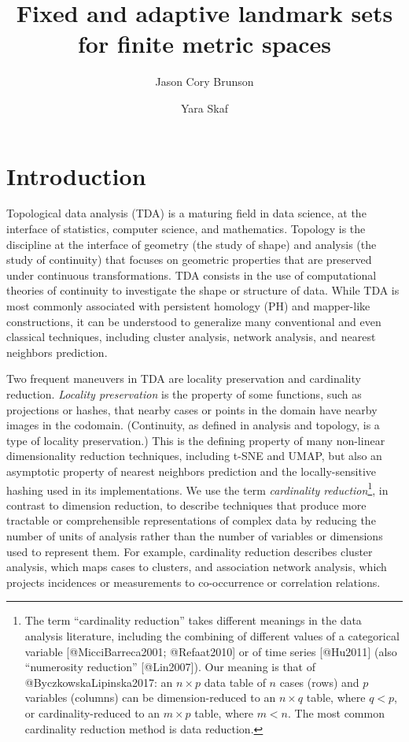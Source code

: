 \documentclass[
]{article}
\title{Fixed and adaptive landmark sets for finite metric spaces}
\author{Jason Cory Brunson \and Yara Skaf}
\date{}
\begin{document}
\maketitle

\pagebreak

\hypertarget{introduction}{%
\section{Introduction}\label{introduction}}

Topological data analysis (TDA) is a maturing field in data science, at
the interface of statistics, computer science, and mathematics. Topology
is the discipline at the interface of geometry (the study of shape) and
analysis (the study of continuity) that focuses on geometric properties
that are preserved under continuous transformations. TDA consists in the
use of computational theories of continuity to investigate the shape or
structure of data. While TDA is most commonly associated with persistent
homology (PH) and mapper-like constructions, it can be understood to
generalize many conventional and even classical techniques, including
cluster analysis, network analysis, and nearest neighbors prediction.

Two frequent maneuvers in TDA are locality preservation and cardinality
reduction. \emph{Locality preservation} is the property of some
functions, such as projections or hashes, that nearby cases or points in
the domain have nearby images in the codomain. (Continuity, as defined
in analysis and topology, is a type of locality preservation.) This is
the defining property of many non-linear dimensionality reduction
techniques, including t-SNE and UMAP, but also an asymptotic property of
nearest neighbors prediction and the locally-sensitive hashing used in
its implementations. We use the term \emph{cardinality
reduction}\footnote{The term ``cardinality reduction'' takes different
  meanings in the data analysis literature, including the combining of
  different values of a categorical variable {[}@MicciBarreca2001;
  @Refaat2010{]} or of time series {[}@Hu2011{]} (also ``numerosity
  reduction'' {[}@Lin2007{]}). Our meaning is that of
  @ByczkowskaLipinska2017: an \(n\times p\) data table of \(n\) cases
  (rows) and \(p\) variables (columns) can be dimension-reduced to an
  \(n\times q\) table, where \(q<p\), or cardinality-reduced to an
  \(m\times p\) table, where \(m<n\). The most common cardinality
  reduction method is data reduction.}, in contrast to dimension
reduction, to describe techniques that produce more tractable or
comprehensible representations of complex data by reducing the number of
units of analysis rather than the number of variables or dimensions used
to represent them. For example, cardinality reduction describes cluster
analysis, which maps cases to clusters, and association network
analysis, which projects incidences or measurements to co-occurrence or
correlation relations.
\end{document}
